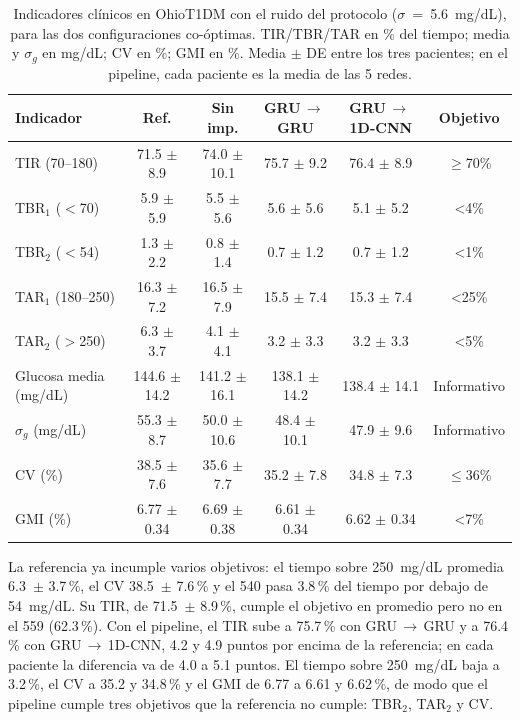 \documentclass{report}
\begin{document}
\begin{table}[!htb]
\centering
\footnotesize
\caption{Indicadores clínicos en OhioT1DM con el ruido del protocolo ($\sigma$~=~5.6~mg/dL), para las dos configuraciones co-óptimas. TIR/TBR/TAR en \% del tiempo; media y $\sigma_g$ en mg/dL; CV en \%; GMI en \%. Media $\pm$ DE entre los tres pacientes; en el pipeline, cada paciente es la media de las 5 redes.}
\label{tab:clinico_ohio}
\begin{tabular}{lccccc}
\toprule
\textbf{Indicador} & Ref. & Sin imp. & GRU\,$\rightarrow$\,GRU & GRU\,$\rightarrow$\,1D-CNN & \textbf{Objetivo} \\
\midrule
TIR (70--180)         & 71.5 $\pm$ 8.9    & 74.0 $\pm$ 10.1   & 75.7 $\pm$ 9.2    & 76.4 $\pm$ 8.9    & $\geq$70\% \\
TBR$_1$ ($<$70)       & 5.9 $\pm$ 5.9     & 5.5 $\pm$ 5.6     & 5.6 $\pm$ 5.6     & 5.1 $\pm$ 5.2     & <4\% \\
TBR$_2$ ($<$54)       & 1.3 $\pm$ 2.2     & 0.8 $\pm$ 1.4     & 0.7 $\pm$ 1.2     & 0.7 $\pm$ 1.2     & <1\% \\
TAR$_1$ (180--250)    & 16.3 $\pm$ 7.2    & 16.5 $\pm$ 7.9    & 15.5 $\pm$ 7.4    & 15.3 $\pm$ 7.4    & <25\% \\
TAR$_2$ ($>$250)      & 6.3 $\pm$ 3.7     & 4.1 $\pm$ 4.1     & 3.2 $\pm$ 3.3     & 3.2 $\pm$ 3.3     & <5\% \\
Glucosa media (mg/dL) & 144.6 $\pm$ 14.2  & 141.2 $\pm$ 16.1  & 138.1 $\pm$ 14.2  & 138.4 $\pm$ 14.1  & Informativo \\
$\sigma_g$ (mg/dL)    & 55.3 $\pm$ 8.7    & 50.0 $\pm$ 10.6   & 48.4 $\pm$ 10.1   & 47.9 $\pm$ 9.6    & Informativo \\
CV (\%)               & 38.5 $\pm$ 7.6    & 35.6 $\pm$ 7.7    & 35.2 $\pm$ 7.8    & 34.8 $\pm$ 7.3    & $\leq$36\% \\
GMI (\%)              & 6.77 $\pm$ 0.34   & 6.69 $\pm$ 0.38   & 6.61 $\pm$ 0.34   & 6.62 $\pm$ 0.34   & <7\% \\
\bottomrule
\end{tabular}
\end{table}
 
La referencia ya incumple varios objetivos: el tiempo sobre 250~mg/dL promedia 6.3~$\pm$ 3.7\,\%, el CV 38.5~$\pm$ 7.6\,\% y el 540 pasa 3.8\,\% del tiempo por debajo de 54~mg/dL. Su TIR, de 71.5~$\pm$ 8.9\,\%, cumple el objetivo en promedio pero no en el 559 (62.3\,\%). Con el pipeline, el TIR sube a 75.7\,\% con GRU\,$\rightarrow$\,GRU y a 76.4\,\% con GRU\,$\rightarrow$\,1D-CNN, 4.2 y 4.9 puntos por encima de la referencia; en cada paciente la diferencia va de 4.0 a 5.1 puntos. El tiempo sobre 250~mg/dL baja a 3.2\,\%, el CV a 35.2 y 34.8\,\% y el GMI de 6.77 a 6.61 y 6.62\,\%, de modo que el pipeline cumple tres objetivos que la referencia no cumple: TBR$_2$, TAR$_2$ y CV.
\end{document}

